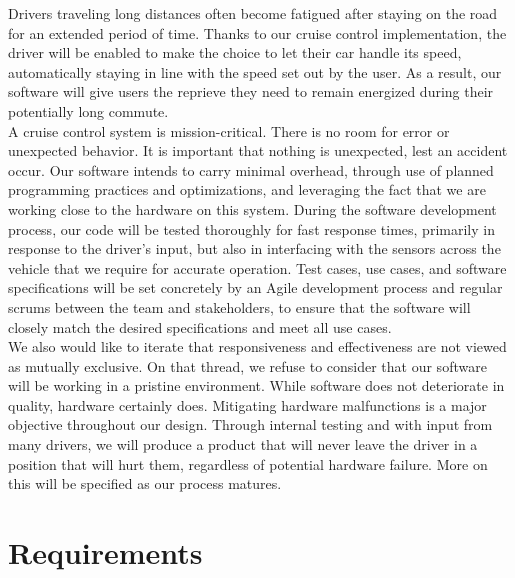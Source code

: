 \documentclass{article}
\begin{document}
	\indent Drivers traveling long distances often become fatigued after staying on the road for an extended period of time. Thanks to our cruise control implementation, the driver will be enabled to make the choice to let their car handle its speed, automatically staying in line with the speed set out by the user. As a result, our software will give users the reprieve they need to remain energized during their potentially long commute. \\
	
	\indent A cruise control system is mission-critical. There is no room for error or unexpected behavior. It is important that nothing is unexpected, lest an accident occur. Our software intends to carry minimal overhead, through use of planned programming practices and optimizations, and leveraging the fact that we are working close to the hardware on this system. During the software development process, our code will be tested thoroughly for fast response times, primarily in response to the driver’s input, but also in interfacing with the sensors across the vehicle that we require for accurate operation. Test cases, use cases, and software specifications will be set concretely by an Agile development process and regular scrums between the team and stakeholders, to ensure that the software will closely match the desired specifications and meet all use cases. \\
	
	\indent We also would like to iterate that responsiveness and effectiveness are not viewed as mutually exclusive. On that thread, we refuse to consider that our software will be working in a pristine environment. While software does not deteriorate in quality, hardware certainly does. Mitigating hardware malfunctions is a major objective throughout our design. Through internal testing and with input from many drivers, we will produce a product that will never leave the driver in a position that will hurt them, regardless of potential hardware failure. More on this will be specified as our process matures.
	
	\newpage
	\section{Requirements}
\end{document}
